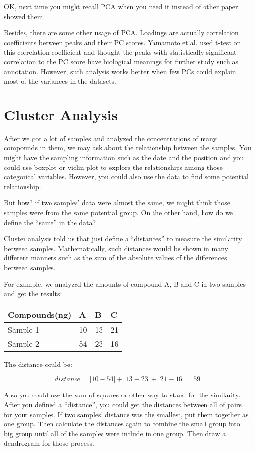 \documentclass[
]{book}
\begin{document}
OK, next time you might recall PCA when you need it instead of other paper showed them.

Besides, there are some other usage of PCA. Loadings are actually correlation coefficients between peaks and their PC scores. Yamamoto et.al.\citep{yamamoto2014} used t-test on this correlation coefficient and thought the peaks with statistically significant correlation to the PC score have biological meanings for further study such as annotation. However, such analysis works better when few PCs could explain most of the variances in the datasets.

\hypertarget{cluster-analysis}{%
\section{Cluster Analysis}\label{cluster-analysis}}

After we got a lot of samples and analyzed the concentrations of many compounds in them, we may ask about the relationship between the samples. You might have the sampling information such as the date and the position and you could use boxplot or violin plot to explore the relationships among those categorical variables. However, you could also use the data to find some potential relationship.

But how? if two samples' data were almost the same, we might think those samples were from the same potential group. On the other hand, how do we define the ``same'' in the data?

Cluster analysis told us that just define a ``distances'' to measure the similarity between samples. Mathematically, such distances would be shown in many different manners such as the sum of the absolute values of the differences between samples.

For example, we analyzed the amounts of compound A, B and C in two samples and get the results:

\begin{longtable}[]{@{}llll@{}}
\toprule
Compounds(ng) & A & B & C\tabularnewline
\midrule
\endhead
Sample 1 & 10 & 13 & 21\tabularnewline
Sample 2 & 54 & 23 & 16\tabularnewline
\bottomrule
\end{longtable}

The distance could be:

\[
distance = |10-54|+|13-23|+|21-16| = 59
\]

Also you could use the sum of squares or other way to stand for the similarity. After you defined a ``distance'', you could get the distances between all of pairs for your samples. If two samples' distance was the smallest, put them together as one group. Then calculate the distances again to combine the small group into big group until all of the samples were include in one group. Then draw a dendrogram for those process.
\end{document}
